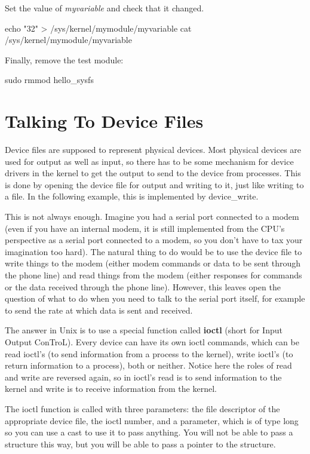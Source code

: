 \documentclass[10pt, oneside]{book}
\begin{document}
Set the value of \emph{myvariable} and check that it changed.

\begin{codebash}
echo "32" > /sys/kernel/mymodule/myvariable
cat /sys/kernel/mymodule/myvariable
\end{codebash}

Finally, remove the test module:

\begin{codebash}
sudo rmmod hello_sysfs
\end{codebash}

\section{Talking To Device Files}
\label{sec:device_files}
Device files are supposed to represent physical devices.
Most physical devices are used for output as well as input, so there has to be some mechanism for device drivers in the kernel to get the output to send to the device from processes.
This is done by opening the device file for output and writing to it, just like writing to a file.
In the following example, this is implemented by device\_write.

This is not always enough.
Imagine you had a serial port connected to a modem (even if you have an internal modem, it is still implemented from the CPU's perspective as a serial port connected to a modem, so you don't have to tax your imagination too hard).
The natural thing to do would be to use the device file to write things to the modem (either modem commands or data to be sent through the phone line) and read things from the modem (either responses for commands or the data received through the phone line).
However, this leaves open the question of what to do when you need to talk to the serial port itself, for example to send the rate at which data is sent and received.

The answer in Unix is to use a special function called \textbf{ioctl} (short for Input Output ConTroL).
Every device can have its own ioctl commands, which can be read ioctl's (to send information from a process to the kernel), write ioctl's (to return information to a process), both or neither.
Notice here the roles of read and write are reversed again, so in ioctl's read is to send information to the kernel and write is to receive information from the kernel.

The ioctl function is called with three parameters: the file descriptor of the appropriate device file, the ioctl number, and a parameter, which is of type long so you can use a cast to use it to pass anything.
You will not be able to pass a structure this way, but you will be able to pass a pointer to the structure.
\end{document}

